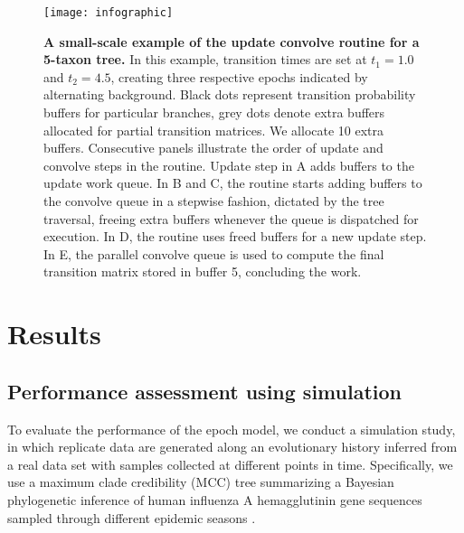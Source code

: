 \begin{figure}[H]
\centering
\texttt{[image: infographic]} 
\caption{
{ \footnotesize 
{\bf A small-scale example of the update convolve routine for a 5-taxon tree.} 
In this example, transition times are set at $t_{1} = 1.0$ and $t_{2} = 4.5$, creating three respective epochs indicated by alternating background.
Black dots represent transition probability buffers for particular branches, grey dots denote extra buffers allocated for partial transition matrices.
We allocate 10 extra buffers.  
Consecutive panels illustrate the order of update and convolve steps in the routine.
Update step in A adds buffers to the update work queue. 
In B and C, the routine starts adding buffers to the convolve queue in a stepwise fashion, dictated by the tree traversal, freeing extra buffers whenever the queue is dispatched for execution. 
In D, the routine uses freed buffers for a new update step.
In E, the parallel convolve queue is used to compute the final transition matrix stored in buffer 5, concluding the work.
}%
}
\label{fig:UpdateConvolveExample}
\end{figure}

\section{Results}

\subsection{Performance assessment using simulation}

To evaluate the performance of the epoch model, we conduct a simulation study, in which replicate data are generated along an evolutionary history inferred from a real data set with samples collected at different points in time.
Specifically, we use a maximum clade credibility (MCC) tree summarizing a Bayesian phylogenetic inference of human influenza A hemagglutinin gene sequences sampled through different epidemic seasons \citep{Drummond2010}. 


